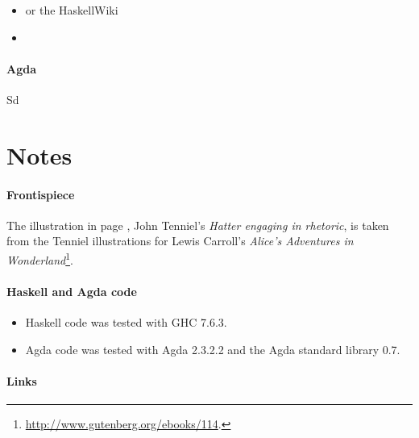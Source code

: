 \begin{itemize}
\item
  \parencites{lipovaca-2011}{osullivan-2008} or the HaskellWiki

\item
  \parencites{elkins-2009}{yorgey-2009}

\end{itemize}

\paragraph{Agda} Sd


\section*{Notes}

\paragraph{Frontispiece}

The illustration in page \pageref{fig:hatter}, John Tenniel's
\emph{Hatter engaging in rhetoric}, is taken from the Tenniel
illustrations for Lewis Carroll's \emph{Alice's Adventures in
  Wonderland}\footnote{\url{http://www.gutenberg.org/ebooks/114}.}.

\paragraph{Haskell and Agda code}

\begin{itemize}
\item
  Haskell code was tested with GHC 7.6.3.

\item
  Agda code was tested with Agda 2.3.2.2 and the Agda standard library
  0.7.

\end{itemize}

\paragraph{Links}

